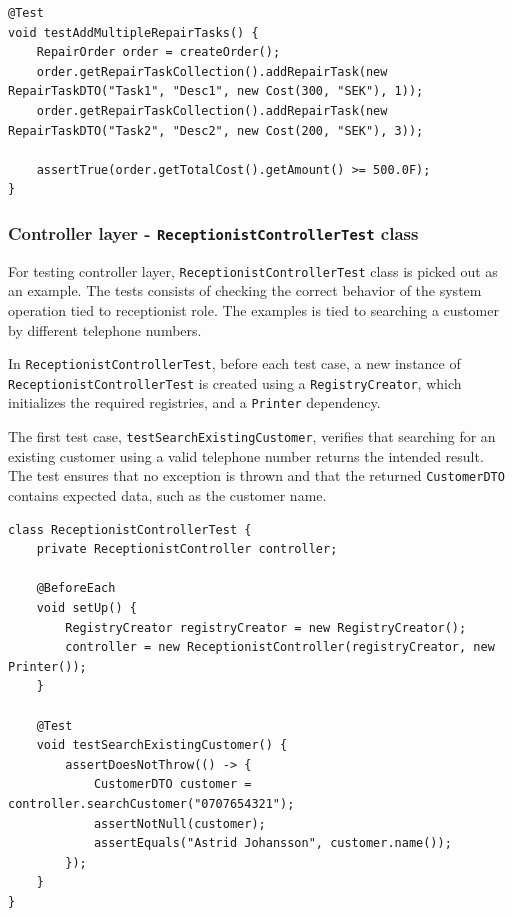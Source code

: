 \documentclass[a4paper]{scrartcl}
\begin{document}
\begin{lstlisting}[style=javastyle, caption={Test for accumulating total cost when adding multiple repair tasks to a \texttt{RepairOrder}}]
@Test
void testAddMultipleRepairTasks() {
    RepairOrder order = createOrder();
    order.getRepairTaskCollection().addRepairTask(new RepairTaskDTO("Task1", "Desc1", new Cost(300, "SEK"), 1));
    order.getRepairTaskCollection().addRepairTask(new RepairTaskDTO("Task2", "Desc2", new Cost(200, "SEK"), 3));

    assertTrue(order.getTotalCost().getAmount() >= 500.0F);
}
\end{lstlisting}

\subsubsection{Controller layer - \texttt{ReceptionistControllerTest} class}

For testing controller layer, \texttt{ReceptionistControllerTest} class is picked out as an example. The tests consists of checking the correct behavior of the system operation tied to receptionist role. The examples is tied to searching a customer by different telephone numbers.

In \texttt{ReceptionistControllerTest}, before each test case, a new instance of \texttt{ReceptionistControllerTest} is created using a \texttt{RegistryCreator}, which initializes the required registries, and a \texttt{Printer} dependency. 

The first test case, \texttt{testSearchExistingCustomer}, verifies that searching for an existing customer using a valid telephone number returns the intended result. The test ensures that no exception is thrown and that the returned \texttt{CustomerDTO} contains expected data, such as the customer name.

\begin{lstlisting}[style=javastyle, caption={Test for searching an existing customer in \texttt{ReceptionistControllerTest}}]
class ReceptionistControllerTest {
    private ReceptionistController controller;

    @BeforeEach
    void setUp() {
        RegistryCreator registryCreator = new RegistryCreator();
        controller = new ReceptionistController(registryCreator, new Printer());
    }

    @Test
    void testSearchExistingCustomer() {
        assertDoesNotThrow(() -> {
            CustomerDTO customer = controller.searchCustomer("0707654321");
            assertNotNull(customer);
            assertEquals("Astrid Johansson", customer.name());
        });
    }
}
\end{lstlisting}
\end{document}
